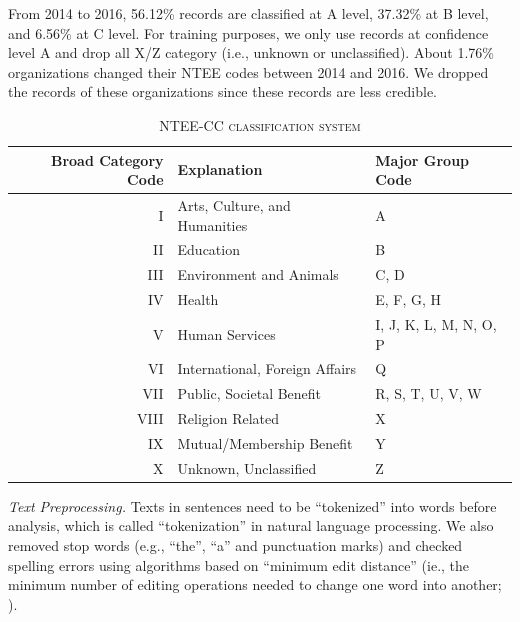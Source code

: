 \documentclass[11pt]{article}
\begin{document}
From 2014 to 2016, 56.12\% records are classified at A level, 37.32\% at B level, and 6.56\% at C level. For training purposes, we only use records at confidence level A and drop all X/Z category (i.e., unknown or unclassified). About 1.76\% organizations changed their NTEE codes between 2014 and 2016. We dropped the records of these organizations since these records are less credible.

\begin{table}[]
    \centering
    \begin{tabularx}{0.9\textwidth}{r|X|X}
    	 \hline
         Broad Category Code & Explanation & Major Group Code \\
         \hline
		I & Arts, Culture, and Humanities & A \\
		II & Education & B \\
		III & Environment and Animals & C, D \\
		IV & Health & E, F, G, H \\
		V & Human Services & I, J, K, L, M, N, O, P \\
		VI & International, Foreign Affairs & Q \\
		VII & Public, Societal Benefit & R, S, T, U, V, W \\
		VIII & Religion Related & X \\
		IX & Mutual/Membership Benefit & Y \\
		X & Unknown, Unclassified & Z \\
         \hline
    \end{tabularx}
    \caption{\textsc{NTEE-CC classification system}} \label{tab:classification}
\end{table}


\textit{Text Preprocessing.} Texts in sentences need to be ``tokenized'' into words before analysis, which is called ``tokenization'' in natural language processing. We also removed stop words (e.g., ``the'', ``a'' and punctuation marks) and checked spelling errors using algorithms based on ``minimum edit distance'' (ie., the minimum number of editing operations needed to change one word into another; \textcite[26]{JurafskySpeechLanguageProcessing2017}).
\end{document}
